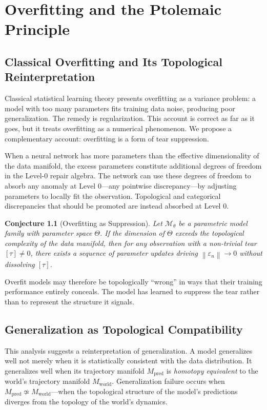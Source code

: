 \documentclass[12pt,oneside]{book}
\theoremstyle{plain}
\newtheorem{conjecture}[theorem]{Conjecture}
\theoremstyle{definition}
\theoremstyle{remark}
\newcommand{\M}{\mathcal{M}}
\newcommand{\eps}{\varepsilon}
\newcommand{\norm}[1]{\left\lVert #1 \right\rVert}
\newcommand{\1}{\mathbf{1}}
\begin{document}
\chapter{Overfitting and the Ptolemaic Principle}

\section{Classical Overfitting and Its Topological Reinterpretation}

Classical statistical learning theory presents overfitting as a variance problem: a model with too many parameters fits training data noise, producing poor generalization. The remedy is regularization. This account is correct as far as it goes, but it treats overfitting as a numerical phenomenon. We propose a complementary account: overfitting is a form of tear suppression.

When a neural network has more parameters than the effective dimensionality of the data manifold, the excess parameters constitute additional degrees of freedom in the Level-0 repair algebra. The network can use these degrees of freedom to absorb any anomaly at Level 0---any pointwise discrepancy---by adjusting parameters to locally fit the observation. Topological and categorical discrepancies that should be promoted are instead absorbed at Level 0.

\begin{conjecture}[Overfitting as Suppression]
Let $\M_\theta$ be a parametric model family with parameter space $\Theta$. If the dimension of $\Theta$ exceeds the topological complexity of the data manifold, then for any observation with a non-trivial tear $[\tau] \neq 0$, there exists a sequence of parameter updates driving $\norm{\eps_n} \to 0$ without dissolving $[\tau]$.
\end{conjecture}

Overfit models may therefore be topologically ``wrong'' in ways that their training performance entirely conceals. The model has learned to suppress the tear rather than to represent the structure it signals.

\section{Generalization as Topological Compatibility}

This analysis suggests a reinterpretation of generalization. A model generalizes well not merely when it is statistically consistent with the data distribution. It generalizes well when its trajectory manifold $M_{\mathrm{pred}}$ is \emph{homotopy equivalent} to the world's trajectory manifold $M_{\mathrm{world}}$. Generalization failure occurs when $M_{\mathrm{pred}} \not\simeq M_{\mathrm{world}}$---when the topological structure of the model's predictions diverges from the topology of the world's dynamics.
\end{document}
